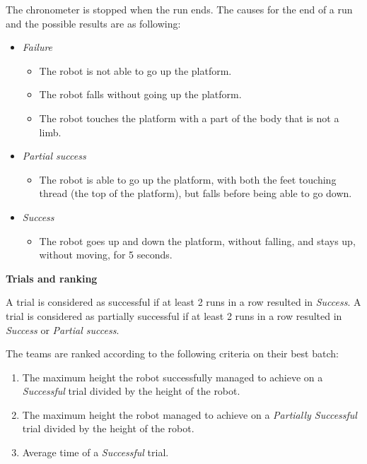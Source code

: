 The chronometer is stopped when the run ends. The causes for the end of a run and
the possible results are as following:
\begin{itemize}
\item \textit{Failure}
  \begin{itemize}
    \item The robot is not able to go up the platform.
    \item The robot falls without going up the platform.
        \item The robot touches the platform with a part of the body that is not a limb.
     \end{itemize}
\item \textit{Partial success}
  \begin{itemize}
    \item The robot is able to go up the platform, with both the feet touching thread (the top of the platform), but falls before being able to go down.
  \end{itemize}
\item \textit{Success}
  \begin{itemize}
    \item The robot goes up and down the platform, without falling, and stays up, without moving, for 5 seconds.
  \end{itemize}
\end{itemize}

{\bfseries Trials and ranking}

\smallskip

A trial is considered as successful if at least 2 runs in a row resulted in \textit{Success}. A trial is considered as
partially successful if at least 2 runs in a row resulted in \textit{Success} or \textit{Partial success}.

The teams are ranked according to the following criteria on their best batch:
\begin{enumerate}
\item The maximum height the robot successfully managed to achieve on a \textit{Successful} trial divided by the height of the robot.
\item The maximum height the robot managed to achieve on a \textit{Partially Successful} trial divided by the height of the robot.
\item Average time of a \textit{Successful} trial.
\end{enumerate}
